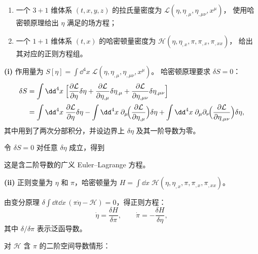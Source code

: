 \begin{question}[场论——哈密顿原理与正则方程]

\begin{enumerate}[label=(\roman*)]
  \item 一个 $3+1$ 维体系 $(t,x,y,z)$ 的拉氏量密度为
  $\mathcal{L}(\eta,\eta_{,\mu},\eta_{,\mu\nu},x^{\mu})$，
  使用哈密顿原理给出 $\eta$ 满足的场方程；
  \item 一个 $1+1$ 维体系 $(t,x)$ 的哈密顿量密度为
  $\mathcal{H}(\eta,\eta_{,x},\pi,\pi_{,x},\pi_{,xx})$，
  给出其对应的正则方程组。
\end{enumerate}

\begin{solution}

\textbf{(i)} 作用量为 $S[\eta]=\displaystyle\int\dd^{4}x\;\mathcal{L}
(\eta,\eta_{,\mu},\eta_{,\mu\nu},x^{\mu})$。
哈密顿原理要求 $\delta S=0$：
\begin{align*}
\delta S&=\int\dd^{4}x\;\Bigl[
\frac{\partial\mathcal{L}}{\partial\eta}\delta\eta
+\frac{\partial\mathcal{L}}{\partial\eta_{,\mu}}\delta\eta_{,\mu}
+\frac{\partial\mathcal{L}}{\partial\eta_{,\mu\nu}}\delta\eta_{,\mu\nu}
\Bigr] \\[2pt]
&=\int\dd^{4}x\;
\frac{\partial\mathcal{L}}{\partial\eta}\delta\eta
-\int\dd^{4}x\;\partial_{\mu}\!\Bigl(\frac{\partial\mathcal{L}}{\partial\eta_{,\mu}}\Bigr)\delta\eta
+\int\dd^{4}x\;\partial_{\mu}\partial_{\nu}\!\Bigl(
\frac{\partial\mathcal{L}}{\partial\eta_{,\mu\nu}}\Bigr)\delta\eta,
\end{align*}
其中用到了两次分部积分，并设边界上 $\delta\eta$ 及其一阶导数为零。

令 $\delta S=0$ 对任意 $\delta\eta$ 成立，得到


这是含二阶导数的广义 Euler--Lagrange 方程。

\textbf{(ii)} 正则变量为 $\eta$ 和 $\pi$，哈密顿量为
$\displaystyle H=\int\dd x\;\mathcal{H}(\eta,\eta_{,x},\pi,\pi_{,x},\pi_{,xx})$。

由变分原理 $\delta\int\dd t\dd x\,(\pi\dot\eta-\mathcal{H})=0$，得正则方程：
\[
\dot\eta=\frac{\delta H}{\delta\pi},\qquad
\dot\pi=-\frac{\delta H}{\delta\eta},
\]
其中 $\delta/\delta\pi$ 表示泛函导数。

对 $\mathcal{H}$ 含 $\pi$ 的二阶空间导数情形：


\end{solution}
\end{question}
